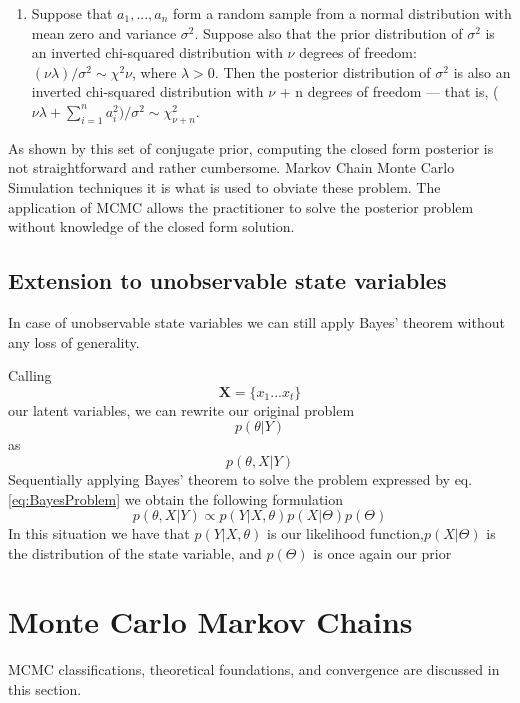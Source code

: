 \documentclass[letterpaper]{article}
\begin{document}
\begin{enumerate}
		\item Suppose that $a_1, . . . , a_n$ form a random sample from a normal distribution with mean zero and variance $\sigma^2$. Suppose also that the prior distribution of $\sigma^2$ is an inverted chi-squared distribution with $\nu$ degrees of freedom: $(\nu \lambda)/\sigma^2 ∼ \chi^2 \nu $, where $\lambda > 0$. Then the posterior distribution of $\sigma^2$ is also an inverted chi-squared distribution with $\nu$ + n degrees of freedom — that is, ($\nu \lambda + \sum_{i=1}^{n} a_i^2 )/\sigma^2 ∼ \chi^2_{\nu+n}$.
	\end{enumerate}
	
	As shown by this set of conjugate prior, computing the closed form posterior is not straightforward and rather cumbersome. Markov Chain Monte Carlo Simulation techniques it is what is used to obviate these problem. The application of MCMC allows the practitioner to solve the posterior problem without knowledge of the closed form solution.
	
	\subsection{Extension to unobservable state variables}
	In case of unobservable state variables we can still apply Bayes' theorem without any loss of generality.
	
	Calling 
	\begin{equation*}
	\textbf{X}=\{x_1...x_t \}
	\end{equation*}
	our latent variables, we can rewrite our original problem
	\begin{equation*}
	p(\theta|Y)
	\end{equation*}
	as 
	\begin{equation}
	p(\theta,X|Y)
	\label{eq:BayesProblem}
	\end{equation}
	Sequentially applying  Bayes' theorem to solve the problem expressed by eq. \ref{eq:BayesProblem} we obtain the following formulation
	\begin{equation}
	p(\theta,X|Y)\propto p(Y|X,\theta)p(X|\Theta)p(\Theta)
	\end{equation}
	In this situation we have that $p(Y|X,\theta)$ is our likelihood function,$p(X|\Theta)$ is the distribution of the state variable, and $p(\Theta)$ is once again our prior
	\newpage
	\section{Monte Carlo Markov Chains}
	MCMC classifications, theoretical foundations, and convergence are discussed in this section.
\end{document}
